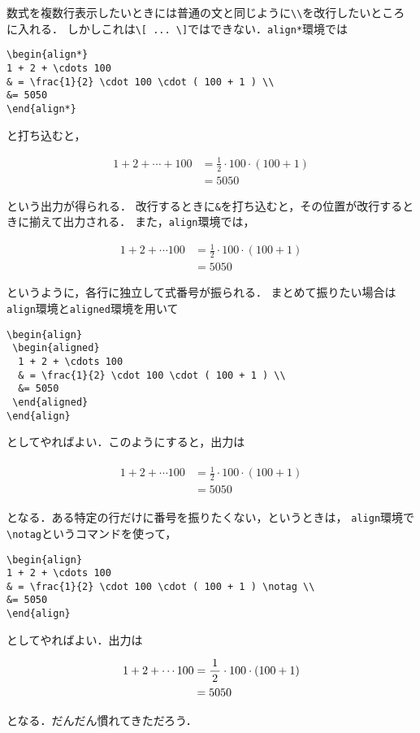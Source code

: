 数式を複数行表示したいときには普通の文と同じように\verb|\\|を改行したいところに入れる．
しかしこれは\verb|\[ ... \]|ではできない．\texttt{align*}環境では
\begin{verbatim}
\begin{align*}
1 + 2 + \cdots 100 
& = \frac{1}{2} \cdot 100 \cdot ( 100 + 1 ) \\
&= 5050
\end{align*}
\end{verbatim}
と打ち込むと，
\begin{oframed}
\begin{align*}
1 + 2 + \cdots + 100 
& = \frac{1}{2} \cdot 100 \cdot ( 100 + 1 ) \\
&= 5050
\end{align*}
\end{oframed}
という出力が得られる．
改行するときに\verb|&|を打ち込むと，その位置が改行するときに揃えて出力される．
また，\texttt{align}環境では，
\begin{oframed}
\begin{align}
1 + 2 + \cdots 100 
& = \frac{1}{2} \cdot 100 \cdot ( 100 + 1 ) \\
&= 5050
\end{align}
\end{oframed}
というように，各行に独立して式番号が振られる．
まとめて振りたい場合は\texttt{align}環境と\texttt{aligned}環境を用いて
\begin{verbatim}
\begin{align}
 \begin{aligned}
  1 + 2 + \cdots 100 
  & = \frac{1}{2} \cdot 100 \cdot ( 100 + 1 ) \\
  &= 5050
 \end{aligned}
\end{align}
\end{verbatim}
としてやればよい．このようにすると，出力は
\begin{oframed}
\begin{align}
 \begin{aligned}
  1 + 2 + \cdots 100 
  & = \frac{1}{2} \cdot 100 \cdot ( 100 + 1 ) \\
  &= 5050
 \end{aligned}
\end{align}
\end{oframed}
となる．ある特定の行だけに番号を振りたくない，というときは，
\texttt{align}環境で\verb|\notag|というコマンドを使って，
\begin{verbatim}
\begin{align}
1 + 2 + \cdots 100 
& = \frac{1}{2} \cdot 100 \cdot ( 100 + 1 ) \notag \\
&= 5050
\end{align}
\end{verbatim}
としてやればよい．出力は
\begin{oframed}
\begin{align}
1 + 2 + \cdots 100 
& = \frac{1}{2} \cdot 100 \cdot ( 100 + 1 ) \notag \\
&= 5050
\end{align}
\end{oframed}
となる．だんだん慣れてきただろう．
